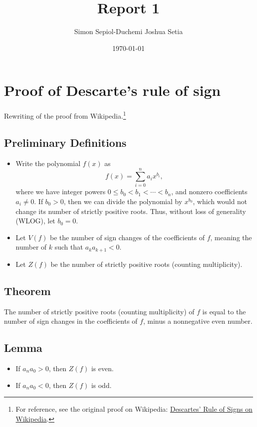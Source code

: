 \documentclass[a4paper,12pt]{article}
\title{Report 1}
\author{Simon Sepiol-Duchemi Joshua Setia}
\date{\today}
\begin{document}
\maketitle

\section{Proof of Descarte's rule of sign}
Rewriting of the proof from Wikipedia.\footnote{For reference, see the original proof on Wikipedia: \href{https://en.wikipedia.org/wiki/Descartes\%27_rule_of_signs}{Descartes' Rule of Signs on Wikipedia}.}


\subsection*{Preliminary Definitions}
\begin{itemize}
    \item Write the polynomial \( f(x) \) as 
    \[
    f(x) = \sum_{i=0}^{n} a_i x^{b_i},
    \]
    where we have integer powers \( 0 \leq b_0 < b_1 < \cdots < b_n \), and nonzero coefficients \( a_i \neq 0 \).
    If \( b_0 > 0 \), then we can divide the polynomial by \( x^{b_0} \), which would not change its number of strictly positive roots. Thus, without loss of generality (WLOG), let \( b_0 = 0 \).

    \item Let \( V(f) \) be the number of sign changes of the coefficients of \( f \), meaning the number of \( k \) such that \( a_k a_{k+1} < 0 \).
    \item Let \( Z(f) \) be the number of strictly positive roots (counting multiplicity).

\end{itemize}

\subsection*{Theorem}
The number of strictly positive roots (counting multiplicity) of \( f \) is equal to the number of sign changes in the coefficients of \( f \), minus a nonnegative even number.


\subsection*{Lemma}
\begin{itemize}
    \item If \( a_n a_0 > 0 \), then \( Z(f) \) is even.
    \item If \( a_n a_0 < 0 \), then \( Z(f) \) is odd.
\end{itemize}
\end{document}
